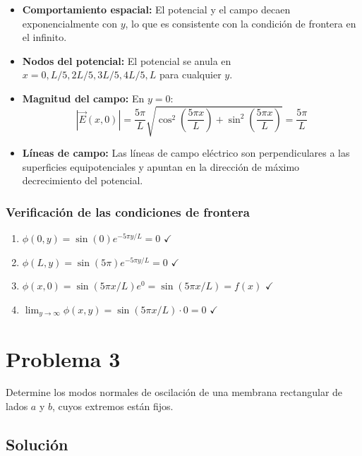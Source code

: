 \documentclass[a4paper]{article}
\begin{document}
\begin{itemize}
    \item \textbf{Comportamiento espacial:} El potencial y el campo decaen exponencialmente con $y$, lo que es consistente con la condición de frontera en el infinito.
    
    \item \textbf{Nodos del potencial:} El potencial se anula en $x = 0, L/5, 2L/5, 3L/5, 4L/5, L$ para cualquier $y$.
    
    \item \textbf{Magnitud del campo:} En $y = 0$:
    \begin{equation}
    |\vec{E}(x, 0)| = \frac{5\pi}{L} \sqrt{\cos^2\left(\frac{5\pi x}{L}\right) + \sin^2\left(\frac{5\pi x}{L}\right)} = \frac{5\pi}{L}
    \end{equation}
    
    \item \textbf{Líneas de campo:} Las líneas de campo eléctrico son perpendiculares a las superficies equipotenciales y apuntan en la dirección de máximo decrecimiento del potencial.
\end{itemize}

\subsubsection{Verificación de las condiciones de frontera}

\begin{enumerate}
    \item $\phi(0, y) = \sin(0) e^{-5\pi y/L} = 0$ $\checkmark$
    \item $\phi(L, y) = \sin(5\pi) e^{-5\pi y/L} = 0$ $\checkmark$ 
    \item $\phi(x, 0) = \sin(5\pi x/L) e^{0} = \sin(5\pi x/L) = f(x)$ $\checkmark$
    \item $\lim_{y \to \infty} \phi(x, y) = \sin(5\pi x/L) \cdot 0 = 0$ $\checkmark$
\end{enumerate}


\section{Problema 3}
Determine los modos normales de oscilación de una membrana rectangular de lados $a$ y $b$, cuyos extremos están fijos.

\subsection{Solución}
\end{document}
